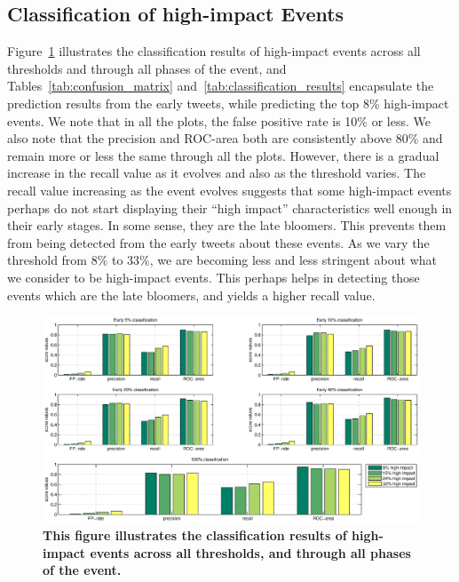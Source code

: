 \documentclass[10pt,letterpaper]{article}
\begin{document}
\subsection{Classification of high-impact Events}
\label{subsec:classification}
Figure~\ref{fig:classification} illustrates the classification results
of high-impact events across all thresholds and through all phases of
the event, and Tables~\ref{tab:confusion_matrix}
and~\ref{tab:classification_results} encapsulate the prediction results
from the early tweets, while predicting the top 8\% high-impact
events. We note that in all the plots, the false positive rate is 
10\% or less. We also note that the precision and ROC-area both are
consistently above 80\% and remain more or less the same through all
the plots. However, there is a gradual increase in the recall value as
it evolves and also as the threshold varies. The recall value
increasing as the event evolves suggests that some high-impact events
perhaps do not start displaying their ``high impact'' characteristics
well enough in their early stages. In some sense, they are the late
bloomers. This prevents them from being detected from the early tweets
about these events. As we vary the threshold from 8\% to 33\%, we are
becoming less and less stringent about what we consider to be
high-impact events. This perhaps helps in detecting those events which
are the late bloomers, and yields a higher recall value.
\begin{figure}
  \includegraphics[width=\textwidth]{figures_SI/Plots_from_data/comprehensive_classification}
  \caption{\textbf{This figure illustrates the classification results
      of high-impact events across all thresholds, and through all
      phases of the event.}}
  \label{fig:classification}
\end{figure}
\end{document}
